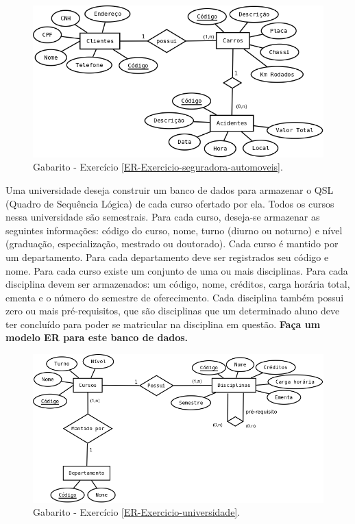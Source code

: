 \documentclass[12pt]{exam}
\begin{document}
\begin{questions}
\begin{figure}[!ht]
\centering
\includegraphics[width=0.9\linewidth]{figuras/ER-Exercicio-seguradora-automoveis.png}
\caption{Gabarito - Exercício \ref{ER-Exercicio-seguradora-automoveis}.}
\end{figure}

\newpage

\question Uma universidade deseja construir um banco de dados para armazenar o QSL (Quadro de Sequência Lógica) de cada curso ofertado por ela. Todos os cursos nessa universidade são semestrais. Para cada curso, deseja-se armazenar as seguintes informações: código do curso, nome, turno (diurno ou noturno) e nível (graduação, especialização, mestrado ou doutorado). Cada curso é mantido por um departamento. Para cada departamento deve ser registrados seu código e nome. Para cada curso existe um conjunto de uma ou mais disciplinas. Para cada disciplina devem ser armazenados: um código, nome, créditos, carga horária total, ementa e o número do semestre de oferecimento. Cada disciplina também possui zero ou mais pré-requisitos, que são disciplinas que um determinado aluno deve ter concluído para poder se matricular na disciplina em questão. 
\textbf{Faça um modelo ER para este banco de dados.}
\label{ER-Exercicio-universidade}

\begin{figure}[!htp]
\centering
\includegraphics[width=1\linewidth]{figuras/ER-Exercicio-universidade.png}
\caption{Gabarito - Exercício \ref{ER-Exercicio-universidade}.}
\end{figure}


\end{questions}
\end{document}
